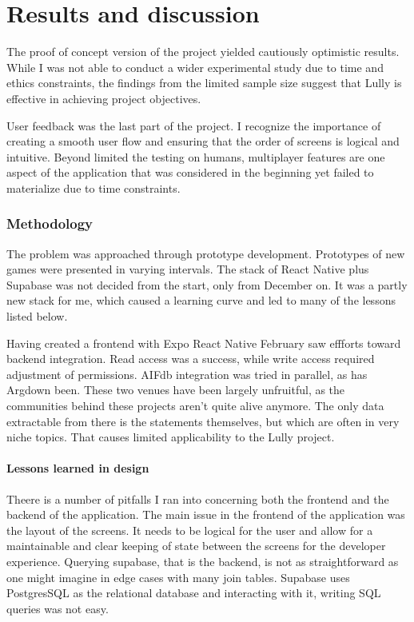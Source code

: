 \documentclass{article}
\begin{document}
\newpage

\chapter{Results and discussion}

The proof of concept version of the  project yielded cautiously optimistic results. While I was not able to conduct a wider experimental study due to time and ethics constraints, the findings from the limited sample size suggest that Lully is effective in achieving project objectives. 

User feedback was the last part of the project. I recognize the importance of creating a smooth user flow and ensuring that the order of screens is logical and intuitive. Beyond limited the testing on humans, multiplayer features are one aspect of the application that was considered in the beginning yet failed to materialize due to time constraints. 

\subsection{Methodology}
The problem was approached through prototype development. Prototypes of new games were presented in varying intervals. The stack of React Native plus Supabase was not decided from the start, only from December on. It was a partly new stack for me, which caused a learning curve and led to many of the lessons listed below.

Having created a frontend with Expo React Native February saw effforts toward backend integration. Read access was a success, while write access required adjustment of permissions. AIFdb integration was tried in parallel, as has Argdown been. These two venues have been largely unfruitful, as the communities behind these projects aren't quite alive anymore. The only data extractable from there is the statements themselves, but which are often in very niche topics. That causes limited applicability to the Lully project. 

\subsubsection{Lessons learned in design}
Theere is a number of pitfalls I ran into concerning both the frontend and the backend of the application. The main issue in the frontend of the application was the layout of the screens. It needs to be logical for the user and allow for a maintainable and clear keeping of state between the screens for the developer experience. Querying supabase, that is the backend, is not as straightforward as one might imagine in edge cases with many join tables. Supabase uses PostgresSQL as the relational database and interacting with it, writing SQL queries was not easy. 
\end{document}
